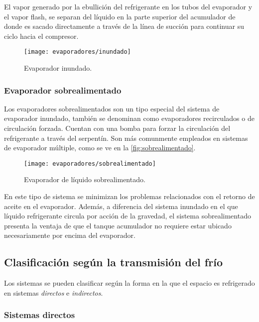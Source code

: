 				El vapor generado por la ebullición del refrigerante en los tubos del evaporador y el vapor flash, se separan del líquido en la parte superior del acumulador de donde es sacado directamente a través de la línea de succión para continuar su ciclo hacia el compresor.
				
				
				\begin{figure}[h]
					\centering
					\texttt{[image: evaporadores/inundado]}
					\caption{Evaporador inundado.}
					\label{fig:inundado}
				\end{figure}
		
			\subsubsection{Evaporador sobrealimentado}
			
				Los evaporadores sobrealimentados son un tipo especial del sistema de evaporador inundado, también se denominan como evaporadores recirculados o de circulación forzada. Cuentan con una bomba para forzar la circulación del refrigerante a través del serpentín. Son más comunmente empleados en sistemas de evaporador múltiple, como se ve en la \autoref{fig:sobrealimentado}.
		
				\begin{figure}[h]
					\centering
					\texttt{[image: evaporadores/sobrealimentado]}
					\caption{Evaporador de líquido sobrealimentado.}
					\label{fig:sobrealimentado}
				\end{figure}
				
				En este tipo de sistema se minimizan los problemas relacionados con el retorno de aceite en el evaporador. Además, a diferencia del sistema inundado en el que líquido refrigerante circula por acción de la gravedad, el sistema sobrealimentado presenta la ventaja de que el tanque acumulador no requiere estar ubicado necesariamente por encima del evaporador.
		
	\subsection{Clasificación según la transmisión del frío}
	
			Los sistemas se pueden clasificar según la forma en la que el espacio es refrigerado en sistemas \emph{directos} e \emph{indirectos}.
			
			\subsubsection{Sistemas directos}
				
